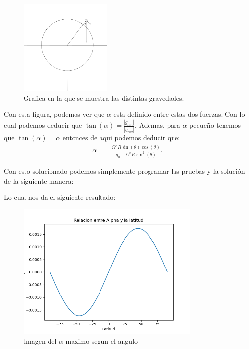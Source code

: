 \documentclass{report}
\begin{document}
\begin{figure}[H]
  \centering
  \includegraphics[width=0.4\textwidth]{img/fig91.png}
  \caption{Grafica en la que se muestra las distintas gravedades.}
  \label{fig:fig91}
\end{figure}

Con esta figura, podemos ver que $\alpha$ esta definido entre estas dos fuerzas. Con lo cual podemos deducir que $\tan(\alpha) = \frac{\left| g_{tan} \right| }{\left| g_{rad} \right| }$. Ademas, para $\alpha$ pequeño tenemos que $\tan\left( \alpha \right) = \alpha$ entonces de aqui podemos deducir que:
\begin{align*}
  \alpha &= \frac{\Omega^2 R \sin\left( \theta \right) \cos\left( \theta \right) }{g_0 - \Omega^2 R \sin^2\left( \theta \right) }
.\end{align*}

Con esto solucionado podemos simplemente programar las pruebas y la solución de la siguiente manera:



Lo cual nos da el siguiente resultado:
\begin{figure}[H]
  \centering
  \includegraphics[width=0.8\textwidth]{img/alpha_tierra.png}
  \caption{Imagen del $\alpha$ maximo segun el angulo}
  \label{fig:img-alpha_tierra-png}
\end{figure}
\end{document}
